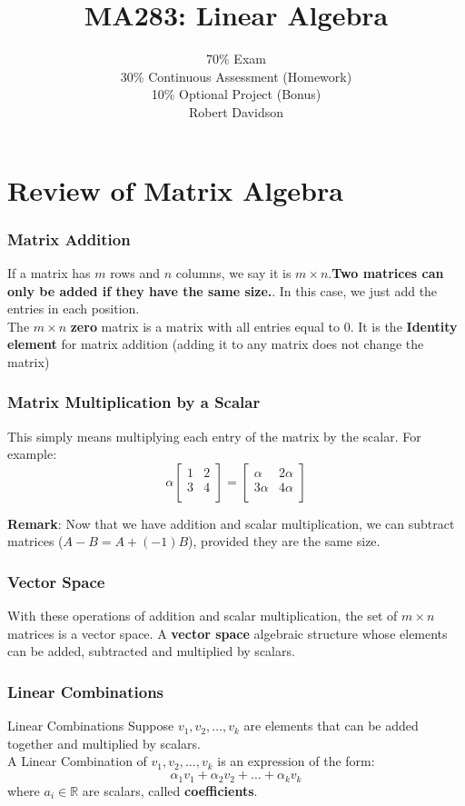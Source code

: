 \documentclass[a4paper, 9pt]{extarticle}
\title{
\textbf{MA283: Linear Algebra} \\ 
}
\author{
  70\% Exam\\
30\% Continuous Assessment (Homework) \\
10\% Optional Project (Bonus)\\ [2ex]
Robert Davidson
}
\date{}       %
\begin{document}
\maketitle
\pagebreak

\tableofcontents
\pagebreak
\section{Review of Matrix Algebra}
\subsubsection*{Matrix Addition}
If a matrix has $m$ rows and $n$ columns, we say it is $m \times n$.\textbf{Two matrices can only be added if they have the same size.}. In this case, we just add the entries in each position. \\[2ex]
The $m \times n$ \textbf{zero} matrix is a matrix with all entries equal to $0$. It is the \textbf{Identity element} for matrix addition (adding it to any matrix does not change the matrix)
\subsubsection*{Matrix Multiplication by a Scalar}
This simply means multiplying each entry of the matrix by the scalar. For example:
$$
  \alpha \begin{bmatrix}
    1 & 2 \\
    3 & 4 \\
  \end{bmatrix}
  =
  \begin{bmatrix}
    \alpha  & 2\alpha \\
    3\alpha & 4\alpha \\
  \end{bmatrix}
$$

\textbf{Remark}: Now that we have addition and scalar multiplication, we can subtract matrices ($A - B = A + (-1)B$), provided they are the same size.

\subsubsection*{Vector Space}
With these operations of addition and scalar multiplication, the set of
$m \times n$ matrices is a vector space. A \textbf{vector space} algebraic structure whose elements can be added, subtracted and multiplied by scalars.

\subsubsection*{Linear Combinations}
\begin{definitionbox}{Linear Combinations}{}
  Suppose $v_1, v_2, \dots, v_k$ are elements that can be added together and multiplied by scalars. \\[2ex]
  A Linear Combination of $v_1, v_2, \dots, v_k$ is an expression of the form:
  $$
    \alpha_1 v_1 + \alpha_2 v_2 + \ldots + \alpha_k v_k
  $$
  where $a_i \in \mathbb{R}$ are scalars, called \textbf{coefficients}.
\end{definitionbox}
\end{document}
